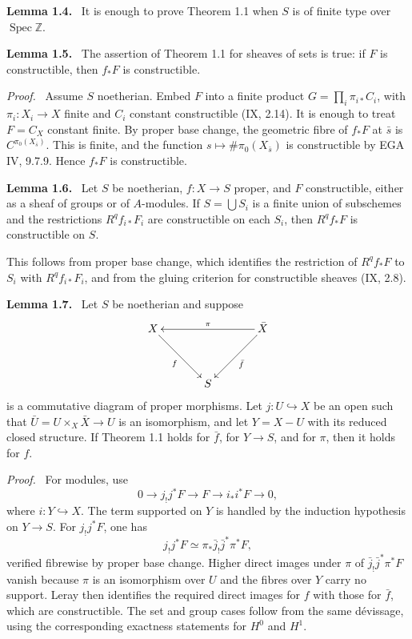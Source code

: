 \documentclass[12pt]{article}
\newcommand{\Zz}{\mathbb{Z}}
\newcommand{\Spec}{\operatorname{Spec}}
\newenvironment{statement}[1]{\par\medskip\noindent\textbf{#1.}\ }{\par\medskip}
\newenvironment{prooftext}[1][Proof]{\par\noindent\emph{#1.}\ }{\par\medskip}
\begin{document}
\begin{statement}{Lemma 1.4}
It is enough to prove Theorem 1.1 when \(S\) is of finite type over \(\Spec\Zz\).
\end{statement}

\begin{statement}{Lemma 1.5}
The assertion of Theorem 1.1 for sheaves of sets is true: if \(F\) is constructible, then \(f_*F\) is constructible.
\end{statement}

\begin{prooftext}
Assume \(S\) noetherian. Embed \(F\) into a finite product \(G=\prod_i\pi_{i*}C_i\), with \(\pi_i:X_i\to X\) finite and \(C_i\) constant constructible (IX, 2.14). It is enough to treat \(F=C_X\) constant finite. By proper base change, the geometric fibre of \(f_*F\) at \(\bar s\) is \(C^{\pi_0(X_{\bar s})}\). This is finite, and the function \(s\mapsto \#\pi_0(X_{\bar s})\) is constructible by EGA IV, 9.7.9. Hence \(f_*F\) is constructible.
\end{prooftext}

\begin{statement}{Lemma 1.6}
Let \(S\) be noetherian, \(f:X\to S\) proper, and \(F\) constructible, either as a sheaf of groups or of \(A\)-modules. If \(S=\bigcup S_i\) is a finite union of subschemes and the restrictions \(R^qf_{i*}F_i\) are constructible on each \(S_i\), then \(R^qf_*F\) is constructible on \(S\).
\end{statement}

This follows from proper base change, which identifies the restriction of \(R^qf_*F\) to \(S_i\) with \(R^qf_{i*}F_i\), and from the gluing criterion for constructible sheaves (IX, 2.8).

\begin{statement}{Lemma 1.7}
Let \(S\) be noetherian and suppose
\[
\xymatrix@=1.25cm{
X\ar[rd]_f&&\bar X\ar[ll]_{\pi}\ar[ld]^{\bar f}\\
&S&
}
\]
is a commutative diagram of proper morphisms. Let \(j:U\hookrightarrow X\) be an open such that \(\bar U=U\times_X\bar X\to U\) is an isomorphism, and let \(Y=X-U\) with its reduced closed structure. If Theorem 1.1 holds for \(\bar f\), for \(Y\to S\), and for \(\pi\), then it holds for \(f\).
\end{statement}

\begin{prooftext}
For modules, use
\[
0\to j_!j^*F\to F\to i_*i^*F\to0,
\]
where \(i:Y\hookrightarrow X\). The term supported on \(Y\) is handled by the induction hypothesis on \(Y\to S\). For \(j_!j^*F\), one has
\[
j_!j^*F\simeq \pi_*\bar j_!\bar j^*\pi^*F,
\]
verified fibrewise by proper base change. Higher direct images under \(\pi\) of \(\bar j_!\bar j^*\pi^*F\) vanish because \(\pi\) is an isomorphism over \(U\) and the fibres over \(Y\) carry no support. Leray then identifies the required direct images for \(f\) with those for \(\bar f\), which are constructible. The set and group cases follow from the same d\'evissage, using the corresponding exactness statements for \(H^0\) and \(H^1\).
\end{prooftext}
\end{document}
